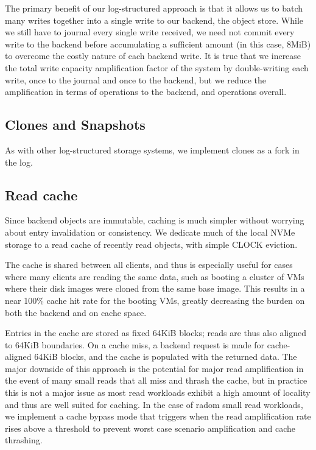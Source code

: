The primary benefit of our log-structured approach is that it allows us to batch
many writes together into a single write to our backend, the object store. While
we still have to journal every single write received, we need not commit every
write to the backend before accumulating a sufficient amount (in this case,
8MiB) to overcome the costly nature of each backend write. It is true that we
increase the total write capacity amplification factor of the system by
double-writing each write, once to the journal and once to the backend, but we
reduce the amplification in terms of operations to the backend, and operations
overall.


\subsection{Clones and Snapshots}

As with other log-structured storage systems, we implement clones as a fork in
the log. 

\subsection{Read cache}

Since backend objects are immutable, caching is much simpler without worrying
about entry invalidation or consistency. We dedicate much of the local NVMe
storage to a read cache of recently read objects, with simple CLOCK eviction.

The cache is shared between all clients, and thus is especially useful for cases
where many clients are reading the same data, such as booting a cluster of VMs
where their disk images were cloned from the same base image. This results in a
near 100\% cache hit rate for the booting VMs, greatly decreasing the burden on
both the backend and on cache space.

Entries in the cache are stored as fixed 64KiB blocks; reads are thus also
aligned to 64KiB boundaries. On a cache miss, a backend request is made for
cache-aligned 64KiB blocks, and the cache is populated with the returned data.
The major downside of this approach is the potential for major read
amplification in the event of many small reads that all miss and thrash the
cache, but in practice this is not a major issue as most read workloads exhibit
a high amount of locality and thus are well suited for caching. In the case
of radom small read workloads, we implement a cache bypass mode that triggers
when the read amplification rate rises above a threshold to prevent worst case
scenario amplification and cache thrashing.

